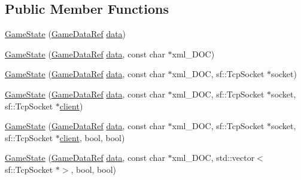 \subsection*{Public Member Functions}
\begin{DoxyCompactItemize}
\item 
\hyperlink{classSekander_1_1GameState_af47a4f5c384bf320048bea9b95b854ea}{Game\+State} (\hyperlink{namespaceSekander_a1d69b002ba2d23020901c28f0def5e16}{Game\+Data\+Ref} \hyperlink{classSekander_1_1GameState_ab267d83dd406910063033004946c83e3}{data})
\item 
\hyperlink{classSekander_1_1GameState_a6003e8f7b7ed16e9cd005972c1738714}{Game\+State} (\hyperlink{namespaceSekander_a1d69b002ba2d23020901c28f0def5e16}{Game\+Data\+Ref} \hyperlink{classSekander_1_1GameState_ab267d83dd406910063033004946c83e3}{data}, const char $\ast$xml\+\_\+\+D\+OC)
\item 
\hyperlink{classSekander_1_1GameState_ada3b0410f31b43c596dfbaf729e82546}{Game\+State} (\hyperlink{namespaceSekander_a1d69b002ba2d23020901c28f0def5e16}{Game\+Data\+Ref} \hyperlink{classSekander_1_1GameState_ab267d83dd406910063033004946c83e3}{data}, const char $\ast$xml\+\_\+\+D\+OC, sf\+::\+Tcp\+Socket $\ast$socket)
\item 
\hyperlink{classSekander_1_1GameState_a00cf0995110149d2e86240bd7514b141}{Game\+State} (\hyperlink{namespaceSekander_a1d69b002ba2d23020901c28f0def5e16}{Game\+Data\+Ref} \hyperlink{classSekander_1_1GameState_ab267d83dd406910063033004946c83e3}{data}, const char $\ast$xml\+\_\+\+D\+OC, sf\+::\+Tcp\+Socket $\ast$socket, sf\+::\+Tcp\+Socket $\ast$\hyperlink{classSekander_1_1GameState_a4096b6555a755229b11091167b02c1f9}{client})
\item 
\hyperlink{classSekander_1_1GameState_acbb55fb2bbaee0294648eb7ea6ab6193}{Game\+State} (\hyperlink{namespaceSekander_a1d69b002ba2d23020901c28f0def5e16}{Game\+Data\+Ref} \hyperlink{classSekander_1_1GameState_ab267d83dd406910063033004946c83e3}{data}, const char $\ast$xml\+\_\+\+D\+OC, sf\+::\+Tcp\+Socket $\ast$socket, sf\+::\+Tcp\+Socket $\ast$\hyperlink{classSekander_1_1GameState_a4096b6555a755229b11091167b02c1f9}{client}, bool, bool)
\item 
\hyperlink{classSekander_1_1GameState_a80541160bcb4bc8edbc1a54bff777817}{Game\+State} (\hyperlink{namespaceSekander_a1d69b002ba2d23020901c28f0def5e16}{Game\+Data\+Ref} \hyperlink{classSekander_1_1GameState_ab267d83dd406910063033004946c83e3}{data}, const char $\ast$xml\+\_\+\+D\+OC, std\+::vector$<$ sf\+::\+Tcp\+Socket $\ast$$>$, bool, bool)
$$
\end{DoxyCompactItemize}
